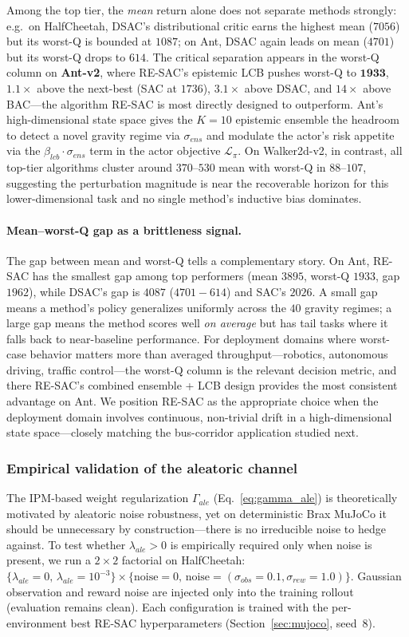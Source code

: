 \documentclass[10pt]{article}
\begin{document}
Among the top tier, the \emph{mean} return alone does not separate methods strongly: e.g.\ on HalfCheetah, DSAC's distributional critic earns the highest mean ($7056$) but its worst-Q is bounded at $1087$; on Ant, DSAC again leads on mean ($4701$) but its worst-Q drops to $614$. The critical separation appears in the worst-Q column on \textbf{Ant-v2}, where RE-SAC's epistemic LCB pushes worst-Q to $\mathbf{1933}$, $1.1{\times}$ above the next-best (SAC at $1736$), $3.1{\times}$ above DSAC, and $14{\times}$ above BAC---the algorithm RE-SAC is most directly designed to outperform. Ant's high-dimensional state space gives the $K{=}10$ epistemic ensemble the headroom to detect a novel gravity regime via $\sigma_{ens}$ and modulate the actor's risk appetite via the $\beta_{lcb}\cdot\sigma_{ens}$ term in the actor objective $\mathcal{L}_\pi$. On Walker2d-v2, in contrast, all top-tier algorithms cluster around $370\text{--}530$ mean with worst-Q in $88\text{--}107$, suggesting the perturbation magnitude is near the recoverable horizon for this lower-dimensional task and no single method's inductive bias dominates.

\paragraph{Mean--worst-Q gap as a brittleness signal.} The gap between mean and worst-Q tells a complementary story. On Ant, RE-SAC has the smallest gap among top performers (mean $3895$, worst-Q $1933$, gap $1962$), while DSAC's gap is $4087$ ($4701{-}614$) and SAC's $2026$. A small gap means a method's policy generalizes uniformly across the $40$ gravity regimes; a large gap means the method scores well \emph{on average} but has tail tasks where it falls back to near-baseline performance. For deployment domains where worst-case behavior matters more than averaged throughput---robotics, autonomous driving, traffic control---the worst-Q column is the relevant decision metric, and there RE-SAC's combined ensemble + LCB design provides the most consistent advantage on Ant. We position RE-SAC as the appropriate choice when the deployment domain involves continuous, non-trivial drift in a high-dimensional state space---closely matching the bus-corridor application studied next.

\subsubsection{Empirical validation of the aleatoric channel}
\label{sec:ipm_validation}
The IPM-based weight regularization $\Gamma_{ale}$ (Eq.~\eqref{eq:gamma_ale}) is theoretically motivated by aleatoric noise robustness, yet on deterministic Brax MuJoCo it should be unnecessary by construction—there is no irreducible noise to hedge against. To test whether $\lambda_{ale}>0$ is empirically required only when noise is present, we run a $2{\times}2$ factorial on HalfCheetah: $\{\lambda_{ale}=0,\,\lambda_{ale}=10^{-3}\} \times \{\text{noise}=0,\,\text{noise}=(\sigma_{obs}{=}0.1, \sigma_{rew}{=}1.0)\}$. Gaussian observation and reward noise are injected only into the training rollout (evaluation remains clean). Each configuration is trained with the per-environment best RE-SAC hyperparameters (Section~\ref{sec:mujoco}, seed~8).
\end{document}
